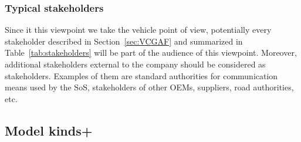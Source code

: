 \subsubsection{Typical stakeholders} 

Since it this viewpoint we take the vehicle point of view, potentially every stakeholder described in Section~\ref{sec:VCGAF} and summarized in Table~\ref{tab:stakeholders} will be part of the audience of this viewpoint. Moreover, additional stakeholders external to the company should be considered as stakeholders. Examples of them are standard authorities for communication means used by the SoS, stakeholders of other OEMs, suppliers, road authorities, etc.

%
%

%
%
%



\subsection{Model kinds+}\label{mk:list}

